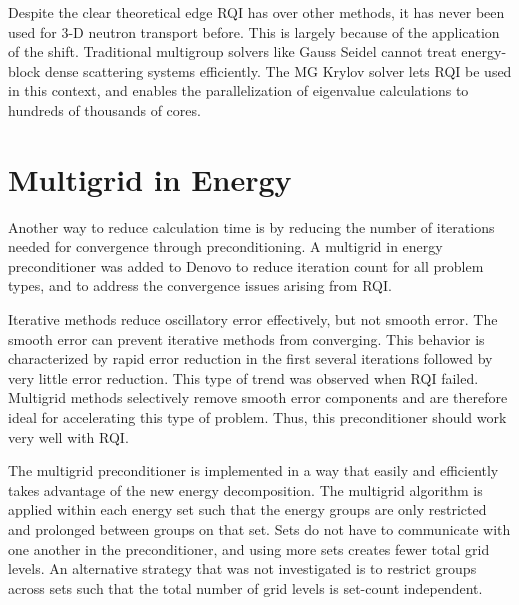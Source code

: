 Despite the clear theoretical edge RQI has over other methods, it has never been used for 3-D neutron transport before. This is largely because of the application of the shift. Traditional multigroup solvers like Gauss Seidel cannot treat energy-block dense scattering systems efficiently. The MG Krylov solver lets RQI be used in this context, and enables the parallelization of eigenvalue calculations to hundreds of thousands of cores. 

\section{Multigrid in Energy}
Another way to reduce calculation time is by reducing the number of iterations needed for convergence through preconditioning. %
A multigrid in energy preconditioner was added to Denovo to reduce iteration count for all problem types, and to address the convergence issues arising from RQI. 

Iterative methods reduce oscillatory error effectively, but not smooth error. The smooth error can prevent iterative methods from converging. This behavior is characterized by rapid error reduction in the first several iterations followed by very little error reduction. This type of trend was observed when RQI failed. Multigrid methods selectively remove smooth error components and are therefore ideal for accelerating this type of problem. Thus, this preconditioner should work very well with RQI. 


The multigrid preconditioner is implemented in a way that easily and efficiently takes advantage of the new energy decomposition. The multigrid algorithm is applied within each energy set such that the energy groups are only restricted and prolonged between groups on that set. Sets do not have to communicate with one another in the preconditioner, and using more sets creates fewer total grid levels. An alternative strategy that was not investigated is to restrict groups across sets such that the total number of grid levels is set-count independent. 

